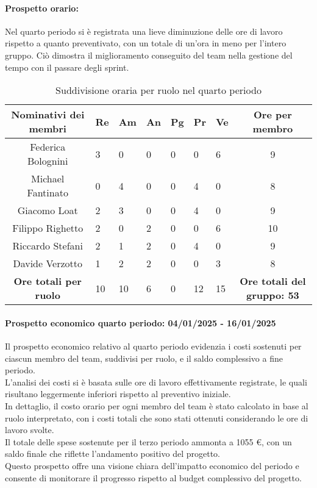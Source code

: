 \paragraph{Prospetto orario: }
Nel quarto periodo si è registrata una lieve diminuzione delle ore di lavoro rispetto a quanto preventivato, con un totale di un'ora in meno per l'intero gruppo.
Ciò dimostra il miglioramento conseguito del team nella gestione del tempo con il passare degli sprint.\\
\begin{table}[h!]
    \centering
    \renewcommand{\arraystretch}{1.5}
    \begin{tabularx}{\textwidth}{|c|X|X|X|X|X|X|c|}\hline
    \rowcolor[HTML]{FFD700} 
    \textbf{Nominativi dei membri} & \textbf{Re} & \textbf{Am} & \textbf{An} & \textbf{Pg} & \textbf{Pr} & \textbf{Ve} & \textbf{Ore per membro} \\ \hline
    Federica Bolognini & 3 & 0 & 0 & 0 & 0 & 6 & 9  \\ \hline
    Michael Fantinato  & 0 & 4 & 0 & 0 & 4 & 0 & 8  \\ \hline
    Giacomo Loat       & 2 & 3 & 0 & 0 & 4 & 0 & 9 \\ \hline
    Filippo Righetto   & 2 & 0 & 2 & 0 & 0 & 6 & 10 \\ \hline
    Riccardo Stefani   & 2 & 1 & 2 & 0 & 4 & 0 & 9 \\ \hline
    Davide Verzotto    & 1 & 2 & 2 & 0 & 0 & 3 & 8  \\ \hline
    \rowcolor[HTML]{FFD700} 
    \textbf{Ore totali per ruolo} & 10 & 10 & 6 & 0 & 12 & 15 & \textbf{Ore totali del gruppo: 53} \\ \hline
    \end{tabularx}
    \caption{Suddivisione oraria per ruolo nel quarto periodo}
\end{table}

\paragraph{Prospetto economico quarto periodo: 04/01/2025 - 16/01/2025}  
Il prospetto economico relativo al quarto periodo evidenzia i costi sostenuti per ciascun membro del team, suddivisi per ruolo, e il saldo complessivo a fine periodo.\\  
L'analisi dei costi si è basata sulle ore di lavoro effettivamente registrate, le quali risultano leggermente inferiori rispetto al preventivo iniziale.\\  
In dettaglio, il costo orario per ogni membro del team è stato calcolato in base al ruolo interpretato, con i costi totali che sono stati ottenuti considerando le ore di lavoro svolte. \\
Il totale delle spese sostenute per il terzo periodo ammonta a 1055 \euro, con un saldo finale che riflette l'andamento positivo del progetto. \\
Questo prospetto offre una visione chiara dell'impatto economico del periodo e consente di monitorare il progresso rispetto al budget complessivo del progetto.

